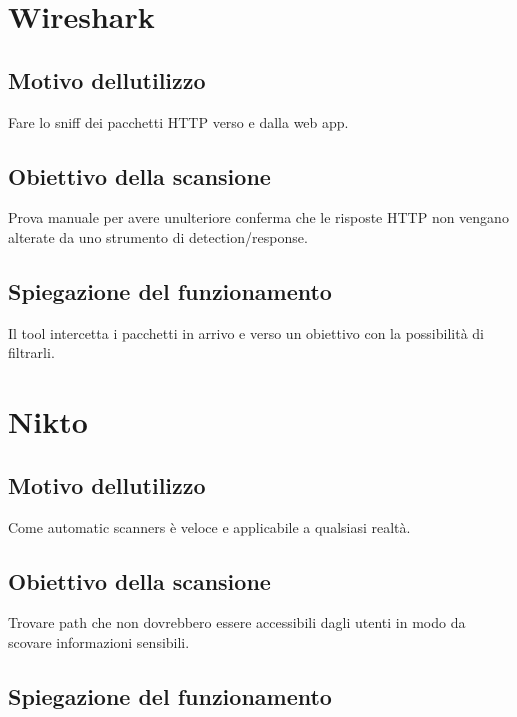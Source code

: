 \section{Wireshark}\label{wireshark}

\subsection{Motivo
dell\textquotesingle utilizzo}\label{motivo-dellutilizzo-4}

Fare lo sniff dei pacchetti HTTP verso e dalla web app.

\subsection{Obiettivo della
scansione}\label{obiettivo-della-scansione-4}

Prova manuale per avere un\textquotesingle ulteriore conferma che le
risposte HTTP non vengano alterate da uno strumento di
detection/response.

\subsection{Spiegazione del
funzionamento}\label{spiegazione-del-funzionamento-4}

Il tool intercetta i pacchetti in arrivo e verso un obiettivo con la
possibilità di filtrarli.

\section{Nikto}\label{nikto}

\subsection{Motivo
dell\textquotesingle utilizzo}\label{motivo-dellutilizzo-5}

Come automatic scanners è veloce e applicabile a qualsiasi realtà.

\subsection{Obiettivo della
scansione}\label{obiettivo-della-scansione-5}

Trovare path che non dovrebbero essere accessibili dagli utenti in modo
da scovare informazioni sensibili.

\subsection{Spiegazione del
funzionamento}\label{spiegazione-del-funzionamento-5}

